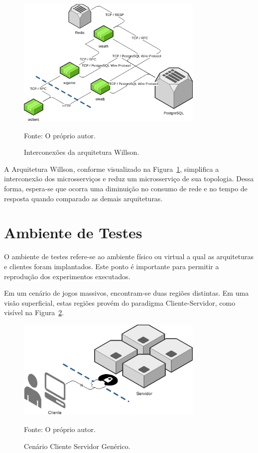 \begin{figure}[htb!]
  \caption{Interconexões da arquitetura Willson.}
  \label{fig:interconexao_willson}
  \includegraphics[width=0.8\textwidth]{figuras/interconexoes/willson.png}
  \centering

  Fonte: O próprio autor.
\end{figure}



A Arquitetura Willson, conforme visualizado na Figura~\ref{fig:interconexao_willson}, simplifica a interconexão dos microsserviços e reduz um microsserviço de sua topologia.
%
Dessa forma, espera-se que ocorra uma diminuição no consumo de rede e no tempo de resposta quando comparado as demais arquiteturas.



\section{Ambiente de Testes}
\label{sec:ambiente_de_testes}



O ambiente de testes refere-se ao ambiente físico ou virtual a qual as arquiteturas e clientes foram implantados.
%
Este ponto é importante para permitir a reprodução dos experimentos executados.



Em um cenário de jogos massivos, encontram-se duas regiões distintas.
%
Em uma visão superficial, estas regiões provém do paradigma Cliente-Servidor, como visível na Figura~\ref{fig:cenario_cliente_servidor}.

\begin{figure}[htb!]
  \caption{Cenário Cliente Servidor Genérico.}
  \label{fig:cenario_cliente_servidor}
  \includegraphics[width=0.8\textwidth]{figuras/ambiente/cs.png}
  \centering

  Fonte: O próprio autor.
\end{figure}



